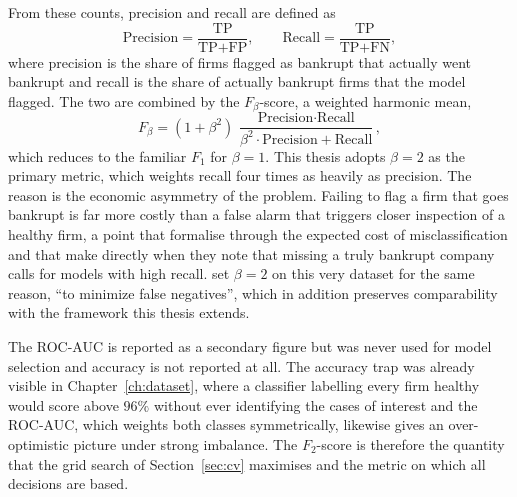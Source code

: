 From these counts, precision and recall are defined as
\begin{equation}
  \text{Precision} = \frac{\text{TP}}{\text{TP} + \text{FP}}, \qquad
  \text{Recall} = \frac{\text{TP}}{\text{TP} + \text{FN}},
  \label{eq:precrec}
\end{equation}
where precision is the share of firms flagged as bankrupt that actually went
bankrupt and recall is the share of actually bankrupt firms that the model flagged. 
The two are combined by the $F_\beta$-score, a weighted harmonic mean,
\begin{equation}
  F_\beta = (1 + \beta^2)\,
  \frac{\text{Precision} \cdot \text{Recall}}
       {\beta^2 \cdot \text{Precision} + \text{Recall}},
  \label{eq:fbeta}
\end{equation}
which reduces to the familiar $F_1$ for $\beta = 1$. This thesis adopts $\beta = 2$
as the primary metric, which weights recall four times as heavily as precision. The
reason is the economic asymmetry of the problem. Failing to flag a firm that
goes bankrupt is far more costly than a false alarm that triggers
closer inspection of a healthy firm, a point that \textcite[117]{veganzones2018}
formalise through the expected cost of misclassification and that
\textcite[15]{ansahnarh2024} make directly when they note that missing a truly
bankrupt company calls for models with high recall. \textcite[8]{wangliu2021} set
$\beta = 2$ on this very dataset for the same reason, ``to minimize false
negatives'', which in addition preserves comparability with the framework this
thesis extends.

The ROC-AUC is reported as a secondary figure but was never used for model
selection and accuracy is not reported at all. The accuracy trap was already
visible in Chapter~\ref{ch:dataset}, where a classifier labelling every firm healthy
would score above $96\%$ without ever identifying the cases of interest and the
ROC-AUC, which weights both classes symmetrically, likewise gives an over-optimistic
picture under strong imbalance. The $F_2$-score is therefore the quantity that the
grid search of Section~\ref{sec:cv} maximises and the metric on which all decisions
are based.